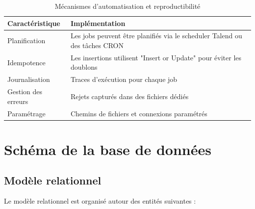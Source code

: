 \documentclass[12pt,a4paper]{article}
\begin{document}
\begin{table}[h!]
\centering
\begin{tabular}{|p{4cm}|p{10.5cm}|}
\hline
\textbf{Caractéristique} & \textbf{Implémentation} \\
\hline
Planification & Les jobs peuvent être planifiés via le scheduler Talend ou des tâches CRON \\
\hline
Idempotence & Les insertions utilisent "Insert or Update" pour éviter les doublons \\
\hline
Journalisation & Traces d'exécution pour chaque job \\
\hline
Gestion des erreurs & Rejets capturés dans des fichiers dédiés \\
\hline
Paramétrage & Chemins de fichiers et connexions paramétrés \\
\hline
\end{tabular}
\caption{Mécanismes d'automatisation et reproductibilité}
\end{table}

\section{Schéma de la base de données}

\subsection{Modèle relationnel}

Le modèle relationnel est organisé autour des entités suivantes :
\end{document}
